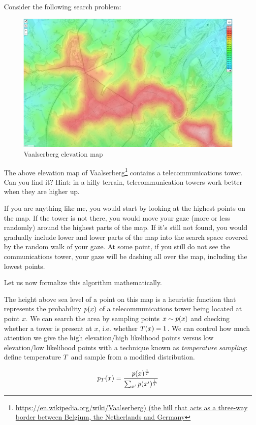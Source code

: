 Consider the following search problem:

\begin{figure}
    \centering
    \includegraphics[width=0.8\linewidth]{images/vaalserberg_lost.png}
    \caption{Vaalserberg elevation map}
\end{figure}


The above elevation map of Vaalserberg\footnote{\url{https://en.wikipedia.org/wiki/Vaalserberg) (the hill that acts as a three-way border between Belgium, the Netherlands and Germany}} contains a telecommunications tower. Can you find it? Hint: in a hilly terrain, telecommunication towers work better when they are higher up.

If you are anything like me, you would start by looking at the highest points on the map.
If the tower is not there, you would move your gaze (more or less randomly) around the highest parts of the map.
If it's still not found, you would gradually include lower and lower parts of the map into the search space covered by the random walk of your gaze.
At some point, if you still do not see the communications tower, your gaze will be dashing all over the map, including the lowest points.

Let us now formalize this algorithm mathematically.

The height above sea level of a point on this map is a heuristic function that represents the probability $p(x)$ of a telecommunications tower being located at point $x$.
We can search the area by sampling points $x \sim p(x)$ and checking whether a tower is present at $x$, i.e. whether $T(x)=1$.
We can control how much attention we give the high elevation/high likelihood points versus low elevation/low likelihood points with a technique known as \emph{temperature sampling}: define temperature $T$ and sample from a modified distribution.

\begin{equation}
p_T(x) = \frac{p(x)^{\frac{1}{T}}}{\sum_{x'} p(x')^{\frac{1}{T}}}
\end{equation}

